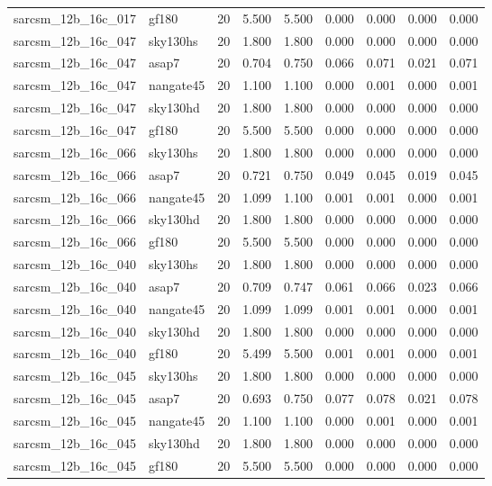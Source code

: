 \begin{tabular}{llrrrrrrr}
sarcsm\_12b\_16c\_017 & gf180 & 20 & 5.500 & 5.500 & 0.000 & 0.000 & 0.000 & 0.000 \\
sarcsm\_12b\_16c\_047 & sky130hs & 20 & 1.800 & 1.800 & 0.000 & 0.000 & 0.000 & 0.000 \\
sarcsm\_12b\_16c\_047 & asap7 & 20 & 0.704 & 0.750 & 0.066 & 0.071 & 0.021 & 0.071 \\
sarcsm\_12b\_16c\_047 & nangate45 & 20 & 1.100 & 1.100 & 0.000 & 0.001 & 0.000 & 0.001 \\
sarcsm\_12b\_16c\_047 & sky130hd & 20 & 1.800 & 1.800 & 0.000 & 0.000 & 0.000 & 0.000 \\
sarcsm\_12b\_16c\_047 & gf180 & 20 & 5.500 & 5.500 & 0.000 & 0.000 & 0.000 & 0.000 \\
sarcsm\_12b\_16c\_066 & sky130hs & 20 & 1.800 & 1.800 & 0.000 & 0.000 & 0.000 & 0.000 \\
sarcsm\_12b\_16c\_066 & asap7 & 20 & 0.721 & 0.750 & 0.049 & 0.045 & 0.019 & 0.045 \\
sarcsm\_12b\_16c\_066 & nangate45 & 20 & 1.099 & 1.100 & 0.001 & 0.001 & 0.000 & 0.001 \\
sarcsm\_12b\_16c\_066 & sky130hd & 20 & 1.800 & 1.800 & 0.000 & 0.000 & 0.000 & 0.000 \\
sarcsm\_12b\_16c\_066 & gf180 & 20 & 5.500 & 5.500 & 0.000 & 0.000 & 0.000 & 0.000 \\
sarcsm\_12b\_16c\_040 & sky130hs & 20 & 1.800 & 1.800 & 0.000 & 0.000 & 0.000 & 0.000 \\
sarcsm\_12b\_16c\_040 & asap7 & 20 & 0.709 & 0.747 & 0.061 & 0.066 & 0.023 & 0.066 \\
sarcsm\_12b\_16c\_040 & nangate45 & 20 & 1.099 & 1.099 & 0.001 & 0.001 & 0.000 & 0.001 \\
sarcsm\_12b\_16c\_040 & sky130hd & 20 & 1.800 & 1.800 & 0.000 & 0.000 & 0.000 & 0.000 \\
sarcsm\_12b\_16c\_040 & gf180 & 20 & 5.499 & 5.500 & 0.001 & 0.001 & 0.000 & 0.001 \\
sarcsm\_12b\_16c\_045 & sky130hs & 20 & 1.800 & 1.800 & 0.000 & 0.000 & 0.000 & 0.000 \\
sarcsm\_12b\_16c\_045 & asap7 & 20 & 0.693 & 0.750 & 0.077 & 0.078 & 0.021 & 0.078 \\
sarcsm\_12b\_16c\_045 & nangate45 & 20 & 1.100 & 1.100 & 0.000 & 0.001 & 0.000 & 0.001 \\
sarcsm\_12b\_16c\_045 & sky130hd & 20 & 1.800 & 1.800 & 0.000 & 0.000 & 0.000 & 0.000 \\
sarcsm\_12b\_16c\_045 & gf180 & 20 & 5.500 & 5.500 & 0.000 & 0.000 & 0.000 & 0.000 \\

\end{tabular}
